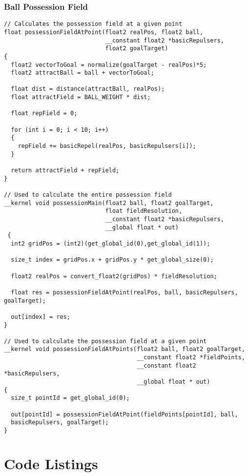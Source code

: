 \subsubsection{Ball Possession Field \label{app:possessionField}}

\begin{lstlisting}
// Calculates the possession field at a given point
float possessionFieldAtPoint(float2 realPos, float2 ball, 
                             __constant float2 *basicRepulsers, 
                             float2 goalTarget) 
{
  float2 vectorToGoal = normalize(goalTarget - realPos)*5;
  float2 attractBall = ball + vectorToGoal;

  float dist = distance(attractBall, realPos);
  float attractField = BALL_WEIGHT * dist;

  float repField = 0;

  for (int i = 0; i < 10; i++)
  {
    repField += basicRepel(realPos, basicRepulsers[i]);
  }

  return attractField + repField;
}

// Used to calculate the entire possession field
__kernel void possessionMain(float2 ball, float2 goalTarget, 
                             float fieldResolution, 
                             __constant float2 *basicRepulsers, 
                             __global float * out) 
 { 
  int2 gridPos = (int2)(get_global_id(0),get_global_id(1));

  size_t index = gridPos.x + gridPos.y * get_global_size(0);

  float2 realPos = convert_float2(gridPos) * fieldResolution;

  float res = possessionFieldAtPoint(realPos, ball, basicRepulsers, goalTarget);

  out[index] = res;
}

// Used to calculate the possession field at a given point
__kernel void possessionFieldAtPoints(float2 ball, float2 goalTarget, 
                                      __constant float2 *fieldPoints, 
                                      __constant float2 *basicRepulsers, 
                                      __global float * out) 
{
  size_t pointId = get_global_id(0);

  out[pointId] = possessionFieldAtPoint(fieldPoints[pointId], ball,
  basicRepulsers, goalTarget); 
}
\end{lstlisting}

\section{Code Listings}

